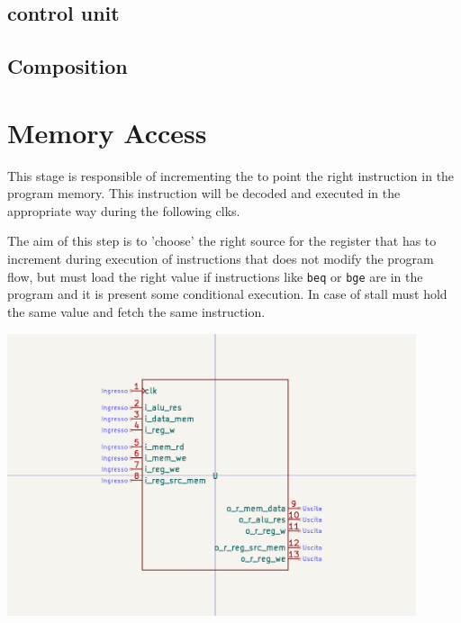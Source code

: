 \documentclass{article}
\begin{document}
\subsection{\ALU}

\subsection{\ALU control unit} \label{ALU_CU}

\subsection*{Composition}


\section{Memory Access}
\begin{minipage}{0.48\textwidth}
This stage is responsible of incrementing the \PC to point the right instruction in the program memory.
This instruction will be decoded and executed in the appropriate way during the following \glspl{clk}. 

The aim of this step is to 'choose' the right source for the \PC register that has to increment during execution of instructions that does not modify the program flow, but must load the right value if instructions like \texttt{beq} or \texttt{bge} are in the program and it is present some conditional execution.
In case of \gls{stall} must hold the same value and fetch the same instruction.
\end{minipage}
\begin{minipage}{0.48\textwidth}
  \includegraphics[width=0.9\textwidth,right,trim={350 150 350 150},clip]{components/MemoryAccess.png}
\end{minipage}
\end{document}
